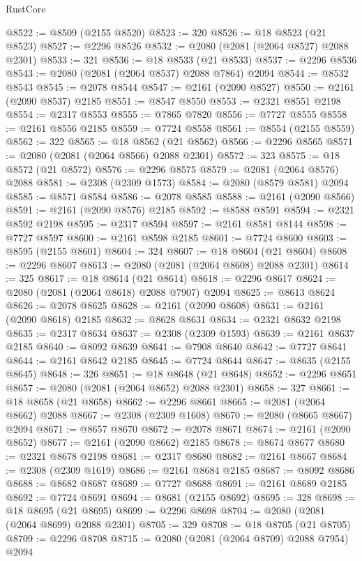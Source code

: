 \begin{lexlean}{RustCore}
\begin{coremodule}
@8522 := @8509 (@2155 @8520)
@8523 := 320
@8526 := @18 @8523 (@21 @8523)
@8527 := @2296 @8526
@8532 := @2080 (@2081 (@2064 @8527) @2088 @2301)
@8533 := 321
@8536 := @18 @8533 (@21 @8533)
@8537 := @2296 @8536
@8543 := @2080 (@2081 (@2064 @8537) @2088 @7864) @2094
@8544 := @8532 @8543
@8545 := @2078 @8544
@8547 := @2161 (@2090 @8527)
@8550 := @2161 (@2090 @8537) @2185
@8551 := @8547 @8550
@8553 := @2321 @8551 @2198
@8554 := @2317 @8553
@8555 := @7865 @7820
@8556 := @7727 @8555
@8558 := @2161 @8556 @2185
@8559 := @7724 @8558
@8561 := @8554 (@2155 @8559)
@8562 := 322
@8565 := @18 @8562 (@21 @8562)
@8566 := @2296 @8565
@8571 := @2080 (@2081 (@2064 @8566) @2088 @2301)
@8572 := 323
@8575 := @18 @8572 (@21 @8572)
@8576 := @2296 @8575
@8579 := @2081 (@2064 @8576) @2088
@8581 := @2308 (@2309 @1573)
@8584 := @2080 (@8579 @8581) @2094
@8585 := @8571 @8584
@8586 := @2078 @8585
@8588 := @2161 (@2090 @8566)
@8591 := @2161 (@2090 @8576) @2185
@8592 := @8588 @8591
@8594 := @2321 @8592 @2198
@8595 := @2317 @8594
@8597 := @2161 @8581 @8144
@8598 := @7727 @8597
@8600 := @2161 @8598 @2185
@8601 := @7724 @8600
@8603 := @8595 (@2155 @8601)
@8604 := 324
@8607 := @18 @8604 (@21 @8604)
@8608 := @2296 @8607
@8613 := @2080 (@2081 (@2064 @8608) @2088 @2301)
@8614 := 325
@8617 := @18 @8614 (@21 @8614)
@8618 := @2296 @8617
@8624 := @2080 (@2081 (@2064 @8618) @2088 @7907) @2094
@8625 := @8613 @8624
@8626 := @2078 @8625
@8628 := @2161 (@2090 @8608)
@8631 := @2161 (@2090 @8618) @2185
@8632 := @8628 @8631
@8634 := @2321 @8632 @2198
@8635 := @2317 @8634
@8637 := @2308 (@2309 @1593)
@8639 := @2161 @8637 @2185
@8640 := @8092 @8639
@8641 := @7908 @8640
@8642 := @7727 @8641
@8644 := @2161 @8642 @2185
@8645 := @7724 @8644
@8647 := @8635 (@2155 @8645)
@8648 := 326
@8651 := @18 @8648 (@21 @8648)
@8652 := @2296 @8651
@8657 := @2080 (@2081 (@2064 @8652) @2088 @2301)
@8658 := 327
@8661 := @18 @8658 (@21 @8658)
@8662 := @2296 @8661
@8665 := @2081 (@2064 @8662) @2088
@8667 := @2308 (@2309 @1608)
@8670 := @2080 (@8665 @8667) @2094
@8671 := @8657 @8670
@8672 := @2078 @8671
@8674 := @2161 (@2090 @8652)
@8677 := @2161 (@2090 @8662) @2185
@8678 := @8674 @8677
@8680 := @2321 @8678 @2198
@8681 := @2317 @8680
@8682 := @2161 @8667
@8684 := @2308 (@2309 @1619)
@8686 := @2161 @8684 @2185
@8687 := @8092 @8686
@8688 := @8682 @8687
@8689 := @7727 @8688
@8691 := @2161 @8689 @2185
@8692 := @7724 @8691
@8694 := @8681 (@2155 @8692)
@8695 := 328
@8698 := @18 @8695 (@21 @8695)
@8699 := @2296 @8698
@8704 := @2080 (@2081 (@2064 @8699) @2088 @2301)
@8705 := 329
@8708 := @18 @8705 (@21 @8705)
@8709 := @2296 @8708
@8715 := @2080 (@2081 (@2064 @8709) @2088 @7954) @2094

\end{coremodule}
\end{lexlean}
